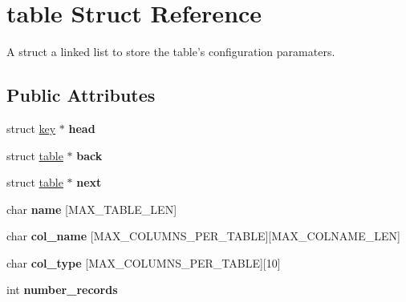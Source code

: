 \hypertarget{structtable}{
\section{table Struct Reference}
\label{structtable}
}


A struct a linked list to store the table's configuration paramaters.  


\subsection*{Public Attributes}
\begin{DoxyCompactItemize}
\item 
\hypertarget{structtable_af2b231e686f241261be4a4e660a9507f}{
struct \hyperlink{structkey}{key} $\ast$ {\bfseries head}}
\label{structtable_af2b231e686f241261be4a4e660a9507f}

\item 
\hypertarget{structtable_aee1eeca8ba26427b6a88fcfa822e09a6}{
struct \hyperlink{structtable}{table} $\ast$ {\bfseries back}}
\label{structtable_aee1eeca8ba26427b6a88fcfa822e09a6}

\item 
\hypertarget{structtable_af57a310935d2e6d39207a999c93d48bf}{
struct \hyperlink{structtable}{table} $\ast$ {\bfseries next}}
\label{structtable_af57a310935d2e6d39207a999c93d48bf}

\item 
\hypertarget{structtable_a08baf93c6c6db4ab67c5684f854e3b38}{
char {\bfseries name} \mbox{[}MAX\_\-TABLE\_\-LEN\mbox{]}}
\label{structtable_a08baf93c6c6db4ab67c5684f854e3b38}

\item 
\hypertarget{structtable_a0ed566793ce0082f94492e3f94883899}{
char {\bfseries col\_\-name} \mbox{[}MAX\_\-COLUMNS\_\-PER\_\-TABLE\mbox{]}\mbox{[}MAX\_\-COLNAME\_\-LEN\mbox{]}}
\label{structtable_a0ed566793ce0082f94492e3f94883899}

\item 
\hypertarget{structtable_ac7bc372a391908a50c645d018ba6b69d}{
char {\bfseries col\_\-type} \mbox{[}MAX\_\-COLUMNS\_\-PER\_\-TABLE\mbox{]}\mbox{[}10\mbox{]}}
\label{structtable_ac7bc372a391908a50c645d018ba6b69d}

\item 
\hypertarget{structtable_aecccc7bd1983d7261fe8ffbd4419a89e}{
int {\bfseries number\_\-records}}
\label{structtable_aecccc7bd1983d7261fe8ffbd4419a89e}

\end{DoxyCompactItemize}


